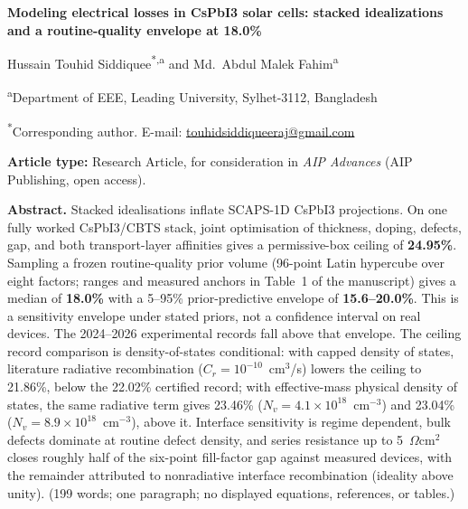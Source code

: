 \documentclass[11pt,a4paper]{article}
\begin{document}
\begin{center}
{\Large\bfseries Modeling electrical losses in CsPbI3 solar cells: stacked idealizations and a routine-quality envelope at 18.0\%}
\end{center}

\begin{center}
Hussain Touhid Siddiquee\textsuperscript{*,a} and Md.\ Abdul Malek Fahim\textsuperscript{a}
\end{center}

\begin{center}
\textsuperscript{a}Department of EEE, Leading University, Sylhet-3112, Bangladesh
\end{center}

\begin{center}
\textsuperscript{*}Corresponding author. E-mail: \url{touhidsiddiqueeraj@gmail.com}
\end{center}

\vspace{1em}
\noindent\textbf{Article type:} Research Article, for consideration in \textit{AIP Advances} (AIP Publishing, open access).

\vspace{1em}
\noindent\textbf{Abstract.} Stacked idealisations inflate SCAPS-1D CsPbI3 projections. On one fully worked CsPbI3/CBTS stack, joint optimisation of thickness, doping, defects, gap, and both transport-layer affinities gives a permissive-box ceiling of \textbf{24.95\%}. Sampling a frozen routine-quality prior volume (96-point Latin hypercube over eight factors; ranges and measured anchors in Table~1 of the manuscript) gives a median of \textbf{18.0\%} with a 5--95\% prior-predictive envelope of \textbf{15.6--20.0\%}. This is a sensitivity envelope under stated priors, not a confidence interval on real devices. The 2024--2026 experimental records fall above that envelope. The ceiling record comparison is density-of-states conditional: with capped density of states, literature radiative recombination ($C_r=10^{-10}$~cm$^3$/s) lowers the ceiling to 21.86\%, below the 22.02\% certified record; with effective-mass physical density of states, the same radiative term gives 23.46\% ($N_v=4.1\times10^{18}$~cm$^{-3}$) and 23.04\% ($N_v=8.9\times10^{18}$~cm$^{-3}$), above it. Interface sensitivity is regime dependent, bulk defects dominate at routine defect density, and series resistance up to 5~$\Omega$cm$^2$ closes roughly half of the six-point fill-factor gap against measured devices, with the remainder attributed to nonradiative interface recombination (ideality above unity). (199 words; one paragraph; no displayed equations, references, or tables.)
\end{document}
